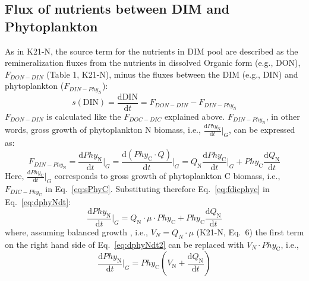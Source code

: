 \documentclass[gmd, manuscript]{copernicus}
\newcommand{\onur}[1]{\textcolor{blue}{\{Onur: #1\}}}
\begin{document}
\subsection{Flux of nutrients between DIM and Phytoplankton}\label{S:DescFlux}
As in K21-N, the source term for the nutrients in DIM pool are described as the remineralization fluxes from the nutrients in dissolved Organic form (e.g., DON), $F_{DON-DIN}$ (Table 1, K21-N), minus the fluxes between the DIM (e.g., DIN) and phytoplankton ($F_{DIN-Phy_\text{N}}$): 
\begin{equation} \label{eq:sdin}
  s(\text{DIN}) = \frac{\text{d}\text{DIN}}{\text{d}t} = F_{DON-DIN} - F_{DIN-Phy_\text{N}}
\end{equation}
$F_{DON-DIN}$ is calculated like the $F_{DOC-DIC}$ explained above. $F_{DIN-Phy_\text{N}}$, in other words, gross growth of phytoplankton N biomass, i.e., $\frac{\text{d}Phy_\text{N}}{\text{d}t} \big\rvert_G$, can be expressed as:
\begin{equation} \label{eq:dphyNdt}
  F_{DIN-Phy_\text{N}} = \frac{\text{d}Phy_\text{N}}{\text{d}t} \bigg\rvert_G=\frac{\text{d}(Phy_\text{C} \cdot Q)}{\text{d}t} \bigg\rvert_G = Q_\text{N} \frac{\text{d} Phy_\text{C}}{\text{d} t} \bigg\rvert_G + Phy_\text{C} \frac{\text{d} Q_\text{N}}{\text{d} t} 
\end{equation}
Here, $\frac{\text{d} Phy_\text{C}}{\text{d} t} \big\rvert_G$ corresponds to gross growth of phytoplankton C biomass, i.e., $F_{DIC-Phy_\text{C}}$ in Eq.~\ref{eq:sPhyC}. Substituting therefore Eq.~\ref{eq:fdicphyc} in Eq.~\ref{eq:dphyNdt}:
\begin{equation} \label{eq:dphyNdt2}
  \frac{\text{d}Phy_\text{N}}{\text{d}t} \bigg\rvert_G= Q_\text{N} \cdot \mu \cdot Phy_\text{C} + Phy_\text{C} \frac{\text{d} Q_\text{N}}{\text{d} t} 
\end{equation}
where, assuming balanced growth \citep{Burmaster1979}, i.e., $V_N = Q_N \cdot \mu$  (K21-N, Eq.~6) the first term on the right hand side of Eq.~\ref{eq:dphyNdt2} can be replaced with $V_N \cdot Phy_\text{C}$, i.e., 
\begin{equation} \label{eq:dphyNdt3}
  \frac{\text{d}Phy_\text{N}}{\text{d}t} \bigg\rvert_G=  Phy_\text{C} \left( V_\text{N} + \frac{\text{d} Q_\text{N}}{\text{d} t} \right)
\end{equation}

\end{document}
